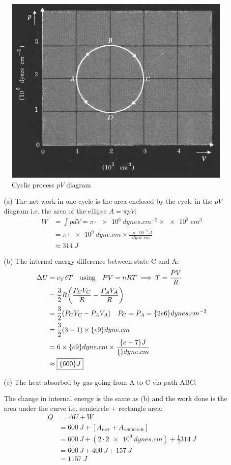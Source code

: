 \documentclass[../main.tex]{subfiles}
\begin{document}
\begin{figure}[ht]
    \centering
    \includegraphics[width=0.5\linewidth]{hw3_4.png}
    \caption{Cyclic process $pV$ diagram}
\end{figure}
\begin{enumerate}
    \item [(a)] The net work in one cycle is the area enclosed by the cycle in the $pV$ diagram i.e. the area of the ellipse $A = \pi pV$:
    \begin{align*}
        W &= \int p dV = \pi \cdot \qty{e6}{dynes.cm^{-2}} \times \qty{e3}{cm^3} \\
        &= \pi \cdot \qty{e9}{dyne.cm} \times \frac{\qty{e-7}{J}}{{\qty{}{dyne.cm}}} \\
        &\approx \boxed{\qty{314}{J}}
    \end{align*}
    \item [(b)] The internal energy difference between state C and A:
    \begin{align*}
        \Delta U &= c_V \delta T \qusing PV = nRT  \implies T = \frac{PV}{R} \\
        &= \frac{3}{2} R \qt(
            \frac{P_C V_C}{R} - \frac{P_A V_A}{R}
        ) \\
        &= \frac{3}{2} \qt(
            P_C V_C - P_A V_A
        ) \quad P_C = P_A = \qty{2e6}{dynes.cm^{-2}} \\
        &= \frac{3}{2} \qt(
            3 - 1 
        ) \times \qty{e9}{dyne.cm} \\
        &= 6 \times \qty{e9}{dyne.cm} \times \frac{\qty{e-7}{J}}{{\qty{}{dyne.cm}}} \\
        &\approx \boxed{\qty{600}{J}}
    \end{align*}
    \item [(c)] The heat absorbed by gas going from A to C via path ABC:
    
    The change in internal energy is the same as (b)
    and the work done is the area under the curve i.e. semicircle $+$  rectangle area:
    \begin{align*}
        Q &= \Delta U + W \\
        &= \qty{600}{J} + [A_\text{rect} + A_\text{semicircle}] \\
        &= \qty{600}{J} + (2 \cdot 2 \qty{e9}{dynes.cm}) + \frac{1}{2} \qty{314}{J} \\
        &= \qty{600}{J} + \qty{400}{J} + \qty{157}{J} \\
        &= \boxed{\qty{1157}{J}}
    \end{align*}
\end{enumerate}
\end{document}
